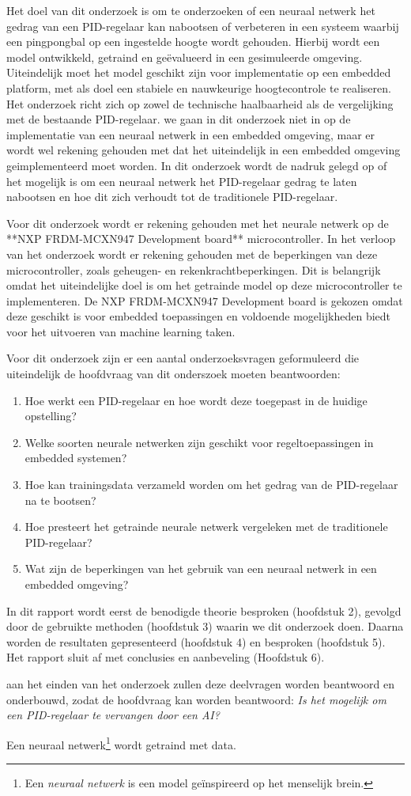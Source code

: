 Het doel van dit onderzoek is om te onderzoeken of een neuraal netwerk het gedrag van een PID-regelaar kan nabootsen of verbeteren in een systeem waarbij een pingpongbal op een ingestelde hoogte wordt gehouden. Hierbij wordt een model ontwikkeld, getraind en geëvalueerd in een gesimuleerde omgeving. Uiteindelijk moet het model geschikt zijn voor implementatie op een embedded platform, met als doel een stabiele en nauwkeurige hoogtecontrole te realiseren. Het onderzoek richt zich op zowel de technische haalbaarheid als de vergelijking met de bestaande PID-regelaar. we gaan in dit onderzoek niet in op de implementatie van een neuraal netwerk in een embedded omgeving, maar er wordt wel rekening gehouden met dat het uiteindelijk in een embedded omgeving geimplementeerd moet worden. In dit onderzoek wordt de nadruk gelegd op of het mogelijk is om een neuraal netwerk het PID-regelaar gedrag te laten nabootsen en hoe dit zich verhoudt tot de traditionele PID-regelaar.

Voor dit onderzoek wordt er rekening gehouden met het neurale netwerk op de **NXP FRDM-MCXN947 Development board** microcontroller. In het verloop van het onderzoek wordt er rekening gehouden met de beperkingen van deze microcontroller, zoals geheugen- en rekenkrachtbeperkingen. Dit is belangrijk omdat het uiteindelijke doel is om het getrainde model op deze microcontroller te implementeren. De NXP FRDM-MCXN947 Development board is gekozen omdat deze geschikt is voor embedded toepassingen en voldoende mogelijkheden biedt voor het uitvoeren van machine learning taken.

Voor dit onderzoek zijn er een aantal onderzoeksvragen geformuleerd die uiteindelijk de hoofdvraag van dit onderszoek moeten beantwoorden:
\begin{enumerate}
  \item Hoe werkt een PID-regelaar en hoe wordt deze toegepast in de huidige opstelling?
  \item Welke soorten neurale netwerken zijn geschikt voor regeltoepassingen in embedded systemen?
  \item Hoe kan trainingsdata verzameld worden om het gedrag van de PID-regelaar na te bootsen?
  \item Hoe presteert het getrainde neurale netwerk vergeleken met de traditionele PID-regelaar?
  \item Wat zijn de beperkingen van het gebruik van een neuraal netwerk in een embedded omgeving?
\end{enumerate}

In dit rapport wordt eerst de benodigde theorie besproken (hoofdstuk 2), gevolgd door de gebruikte methoden (hoofdstuk 3) waarin we dit onderzoek doen. Daarna worden de resultaten gepresenteerd (hoofdstuk 4) en besproken (hoofdstuk 5). Het rapport sluit af met conclusies en aanbeveling (Hoofdstuk 6).

aan het einden van het onderzoek zullen deze deelvragen worden beantwoord en onderbouwd, zodat de hoofdvraag kan worden beantwoord: \textit{Is het mogelijk om een PID-regelaar te vervangen door een AI?}

Een neuraal netwerk\footnote{Een \textit{neuraal netwerk} is een model geïnspireerd op het menselijk brein.} wordt getraind met data.
